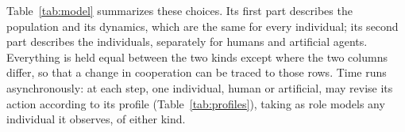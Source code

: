 Table~\ref{tab:model} summarizes these choices. Its first part describes the population and its dynamics, which are the same for every individual; its second part describes the individuals, separately for humans and artificial agents. Everything is held equal between the two kinds except where the two columns differ, so that a change in cooperation can be traced to those rows. Time runs asynchronously: at each step, one individual, human or artificial, may revise its action according to its profile (Table~\ref{tab:profiles}), taking as role models any individual it observes, of either kind.

